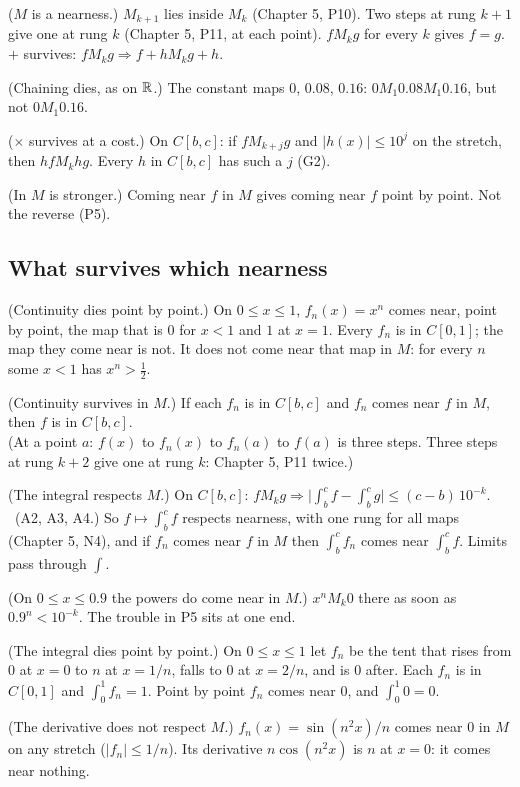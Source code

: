 \begin{lines}
\item[\lab{P1}] ($M$ is a nearness.) $M_{k+1}$ lies inside $M_k$ (Chapter 5, P10). Two steps at rung $k + 1$ give one at rung $k$ (Chapter 5, P11, at each point). $f \mathrel{M_k} g$ for every $k$ gives $f = g$. $+$ survives: $f \mathrel{M_k} g \Rightarrow f + h \mathrel{M_k} g + h$.
\item[\lab{P2}] (Chaining dies, as on $\mathbb{R}$.) The constant maps $0$, $0.08$, $0.16$: $0 \mathrel{M_1} 0.08 \mathrel{M_1} 0.16$, but not $0 \mathrel{M_1} 0.16$.
\item[\lab{P3}] ($\times$ survives at a cost.) On $C[b,c]$: if $f \mathrel{M_{k+j}} g$ and $|h(x)| \le 10^j$ on the stretch, then $h f \mathrel{M_k} h g$. Every $h$ in $C[b,c]$ has such a $j$ (G2).
\item[\lab{P4}] (In $M$ is stronger.) Coming near $f$ in $M$ gives coming near $f$ point by point. Not the reverse (P5).
\end{lines}

\subsection*{What survives which nearness}

\begin{lines}
\item[\lab{P5}] (Continuity dies point by point.) On $0 \le x \le 1$, $f_n(x) = x^n$ comes near, point by point, the map that is $0$ for $x < 1$ and $1$ at $x = 1$. Every $f_n$ is in $C[0,1]$; the map they come near is not. It does not come near that map in $M$: for every $n$ some $x < 1$ has $x^n > \tfrac12$.
\item[\lab{P6}] (Continuity survives in $M$.) If each $f_n$ is in $C[b,c]$ and $f_n$ comes near $f$ in $M$, then $f$ is in $C[b,c]$. \\
(At a point $a$: $f(x)$ to $f_n(x)$ to $f_n(a)$ to $f(a)$ is three steps. Three steps at rung $k + 2$ give one at rung $k$: Chapter 5, P11 twice.)
\item[\lab{P7}] (The integral respects $M$.) On $C[b,c]$: $f \mathrel{M_k} g \Rightarrow \bigl|\int_b^c f - \int_b^c g\bigr| \le (c - b)\,10^{-k}$. \ (A2, A3, A4.) So $f \mapsto \int_b^c f$ respects nearness, with one rung for all maps (Chapter 5, N4), and if $f_n$ comes near $f$ in $M$ then $\int_b^c f_n$ comes near $\int_b^c f$. Limits pass through $\int$.
\item[\lab{P8}] (On $0 \le x \le 0.9$ the powers do come near in $M$.) $x^n \mathrel{M_k} 0$ there as soon as $0.9^n < 10^{-k}$. The trouble in P5 sits at one end.
\item[\lab{P9}] (The integral dies point by point.) On $0 \le x \le 1$ let $f_n$ be the tent that rises from $0$ at $x = 0$ to $n$ at $x = 1/n$, falls to $0$ at $x = 2/n$, and is $0$ after. Each $f_n$ is in $C[0,1]$ and $\int_0^1 f_n = 1$. Point by point $f_n$ comes near $0$, and $\int_0^1 0 = 0$.
\item[\lab{P10}] (The derivative does not respect $M$.) $f_n(x) = \sin(n^2 x)/n$ comes near $0$ in $M$ on any stretch ($|f_n| \le 1/n$). Its derivative $n \cos(n^2 x)$ is $n$ at $x = 0$: it comes near nothing.
\end{lines}

